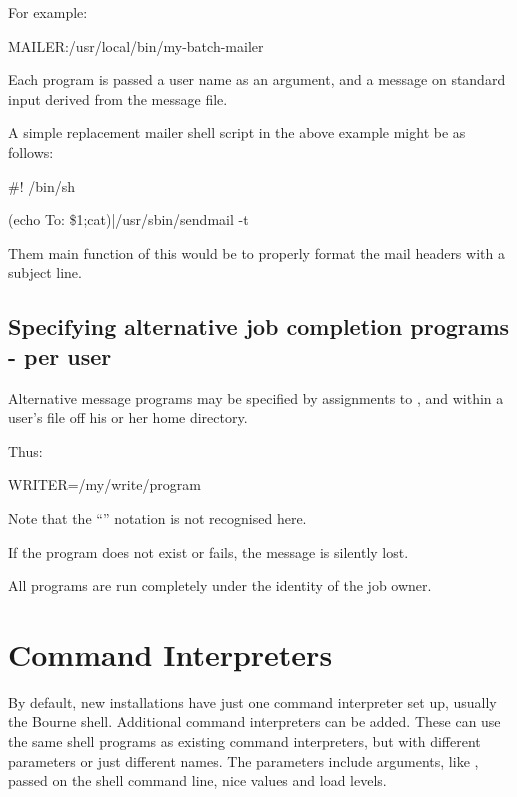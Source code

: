 For example:

\begin{expara}

MAILER:/usr/local/bin/my-batch-mailer

\end{expara}

Each program is passed a user name as an argument, and a message on standard input derived from the message file.

A simple replacement mailer shell script  in the above example might be as follows:

\begin{expara}

\#! /bin/sh

\bigskip

(echo To: \$1;cat)|/usr/sbin/sendmail -t

\end{expara}

Them main function of this would be to properly format the mail headers with a subject line.

\subsection{Specifying alternative job completion programs - per user}
Alternative message programs may be specified by assignments to ,  and
 within a user's \homeconfigpath{} file off his or her home directory.

Thus:

\begin{expara}

WRITER=/my/write/program

\end{expara}

Note that the ``\exampletext{:}'' notation is not recognised here.

If the program does not exist or fails, the message is silently lost.

All programs are run completely under the identity of the job owner.

\section{Command Interpreters}
By default, new \ProductName{} installations have just one command interpreter set up, usually the Bourne shell.
Additional command interpreters can be added. These can use the same shell programs as existing command
interpreters, but with different parameters or just different names.
The parameters include arguments, like ,
passed on the shell command line, nice values and \ProductName{} load levels.

